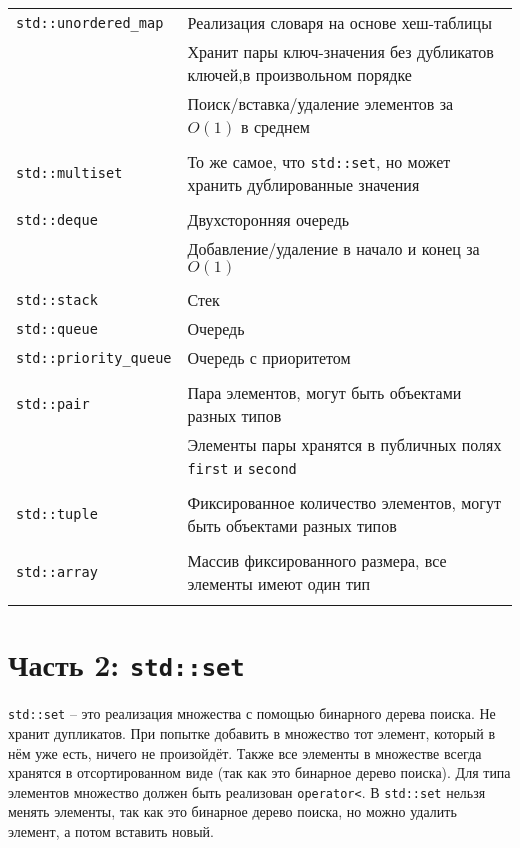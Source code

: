 \documentclass{article}
\begin{document}
\begin{center}
\begin{tabular}{ l | l }
 \texttt{std::unordered\_map} & Реализация словаря на основе хеш-таблицы \\
				   & Хранит пары ключ-значения без дубликатов ключей,в произвольном порядке\\
                   & Поиск/вставка/удаление элементов за $O(1)$ в среднем  \\ \\ \hline
 \texttt{std::multiset} & То же самое, что \texttt{std::set}, но может хранить дублированные значения \\ \\ \hline
 \texttt{std::deque} & Двухсторонняя очередь \\
				     & Добавление/удаление в начало и конец за $O(1)$\\ \\  \hline
 \texttt{std::stack} & Стек \\
 \texttt{std::queue} & Очередь \\
 \texttt{std::priority\_queue} & Очередь с приоритетом \\ \\ \hline
 
 \texttt{std::pair} &  Пара элементов, могут быть объектами разных типов \\
                      & Элементы пары хранятся в публичных полях \texttt{first} и \texttt{second} \\ \\ \hline
 \texttt{std::tuple} &  Фиксированное количество элементов, могут быть объектами разных типов \\ \\ \hline
 \texttt{std::array} &  Массив фиксированного размера, все элементы имеют один тип \\ \\ \hline
\end{tabular}
\end{center}




\newpage
\section*{Часть 2: \texttt{std::set}}
\texttt{std::set} -- это реализация множества с помощью бинарного дерева поиска. Не хранит дупликатов. При попытке добавить в множество тот элемент, который в нём уже есть, ничего не произойдёт. Также все элементы в множестве всегда хранятся в отсортированном виде (так как это бинарное дерево поиска). Для типа элементов множество должен быть реализован \texttt{operator<}. В \texttt{std::set} нельзя менять элементы, так как это бинарное дерево поиска, но можно удалить элемент, а потом вставить новый.\\
\end{document}
